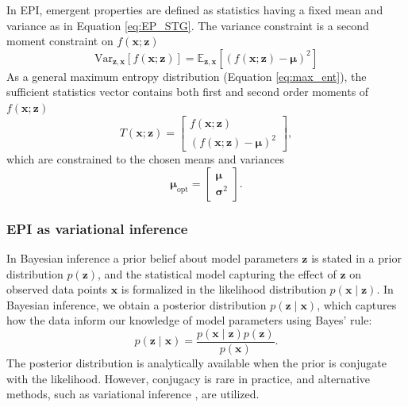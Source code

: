 \documentclass[11pt]{article}
\begin{document}
In EPI, emergent properties are defined as statistics having a fixed mean and variance as in Equation \ref{eq:EP_STG}.
The variance constraint is a second moment constraint on $f(\mathbf{x}; \mathbf{z})$
 \begin{equation}
\text{Var}_{\mathbf{z},\mathbf{x}}\left[f(\mathbf{x}; \mathbf{z})\right] = \mathbb{E}_{\mathbf{z},\mathbf{x}}\left[\left( f(\mathbf{x}; \mathbf{z}) - \bm{\mu}\right) ^2\right]
\end{equation}
As a general maximum entropy distribution (Equation \ref{eq:max_ent}), the sufficient statistics vector contains both first and second order moments of $f(\mathbf{x}; \mathbf{z})$
\begin{equation} \label{eq:moments}
T(\mathbf{x}; \mathbf{z}) = \begin{bmatrix} f(\mathbf{x}; \mathbf{z}) \\ \left( f(\mathbf{x}; \mathbf{z}) - \bm{\mu} \right)^2 \end{bmatrix},
\end{equation}
which are constrained to the chosen means and variances
\begin{equation} \label{eq:mu_opt}
\bm{\mu}_{\text{opt}} = \begin{bmatrix} \bm{\mu} \\ \bm{\sigma}^2 \end{bmatrix}.
\end{equation}


\subsubsection{EPI as variational inference}\label{methods_VI}
In Bayesian inference a prior belief about model parameters $\mathbf{z}$ is stated in a prior distribution $p(\mathbf{z})$, and the statistical model capturing the effect of $\mathbf{z}$ on observed data points $\mathbf{x}$ is formalized in the likelihood distribution $p(\mathbf{x} \mid \mathbf{z})$.
In Bayesian inference, we obtain a posterior distribution $p(\mathbf{z} \mid \mathbf{x})$, which captures how the data inform our knowledge of model parameters using Bayes' rule:
\begin{equation}
p(\mathbf{z} \mid \mathbf{x}) = \frac{p(\mathbf{x} \mid \mathbf{z}) p(\mathbf{z})}{p(\mathbf{x})}.
\end{equation}
The posterior distribution is analytically available when the prior is conjugate with the likelihood.
However, conjugacy is rare in practice, and alternative methods, such as variational inference \cite{saul1998mean}, are utilized.
\end{document}
